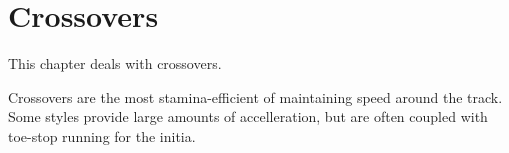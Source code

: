 \chapter{Crossovers}
\label{ch:crossovers}

This chapter deals with crossovers.

Crossovers are the most stamina-efficient of maintaining speed around the track.     
Some styles provide large amounts of accelleration, but are often coupled with toe-stop running for the initia.
